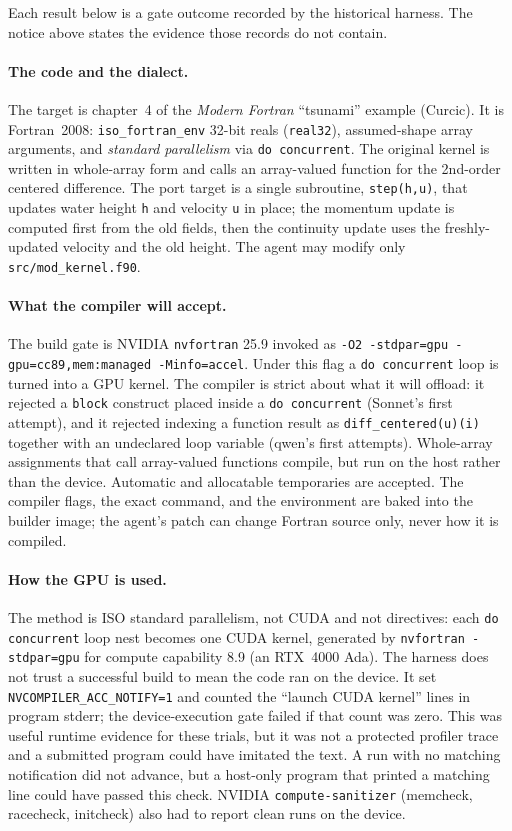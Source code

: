 \documentclass[11pt]{article}
\newcommand{\code}[1]{\texttt{#1}}
\begin{document}
Each result below is a gate outcome recorded by the historical harness. The
notice above states the evidence those records do not contain.

\paragraph{The code and the dialect.}
The target is chapter~4 of the \emph{Modern Fortran} ``tsunami'' example
(Curcic). It is Fortran~2008: \code{iso\_fortran\_env} 32-bit reals
(\code{real32}), assumed-shape array arguments, and \emph{standard parallelism}
via \code{do concurrent}. The original kernel is written in whole-array form and
calls an array-valued function for the 2nd-order centered difference. The port
target is a single subroutine, \code{step(h,u)}, that updates water height
\code{h} and velocity \code{u} in place; the momentum update is computed first
from the old fields, then the continuity update uses the freshly-updated
velocity and the old height. The agent may modify only \code{src/mod\_kernel.f90}.

\paragraph{What the compiler will accept.}
The build gate is NVIDIA \code{nvfortran} 25.9 invoked as
\code{-O2 -stdpar=gpu -gpu=cc89,mem:managed -Minfo=accel}. Under this flag a
\code{do concurrent} loop is turned into a GPU kernel. The compiler is strict
about what it will offload: it rejected a \code{block} construct placed inside a
\code{do concurrent} (Sonnet's first attempt), and it rejected indexing a
function result as \code{diff\_centered(u)(i)} together with an undeclared loop
variable (qwen's first attempts). Whole-array assignments that call array-valued
functions compile, but run on the host rather than the device. Automatic and
allocatable temporaries are accepted. The compiler flags, the exact command, and
the environment are baked into the builder image; the agent's patch can change
Fortran source only, never how it is compiled.

\paragraph{How the GPU is used.}
The method is ISO standard parallelism, not CUDA and not directives: each
\code{do concurrent} loop nest becomes one CUDA kernel, generated by
\code{nvfortran -stdpar=gpu} for compute capability 8.9 (an RTX~4000 Ada). The
harness does not trust a successful build to mean the code ran on the device. It
set \code{NVCOMPILER\_ACC\_NOTIFY=1} and counted the ``launch CUDA kernel'' lines
in program stderr; the device-execution gate failed if that count was zero. This
was useful runtime evidence for these trials, but it was not a protected
profiler trace and a submitted program could have imitated the text. A
run with no matching notification did not advance, but a host-only program that
printed a matching line could have passed this check. NVIDIA
\code{compute-sanitizer} (memcheck, racecheck, initcheck) also had to report
clean runs on the device.
\end{document}
